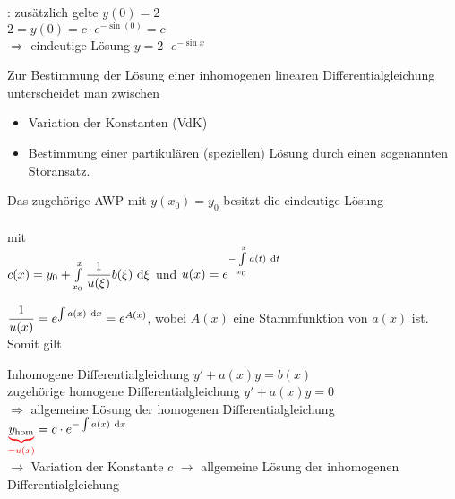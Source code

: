 : zusätzlich gelte $y(0)=2$\\
$2=y(0)=c\cdot e^{-\sin(0)}=c$\\
$\Rightarrow$ eindeutige Lösung $y=2\cdot e^{-\sin x}$

Zur Bestimmung der Lösung einer inhomogenen linearen Differentialgleichung unterscheidet man zwischen
\begin{itemize}
	\item Variation der Konstanten (VdK)
	\item Bestimmung einer partikulären (speziellen) Lösung durch einen sogenannten {\flqq Störansatz\frqq}.
\end{itemize}


Das zugehörige AWP mit $y(x_0)=y_0$ besitzt die eindeutige Lösung\\
\hhspace{2cm}\\
mit\\
\hhspace{2cm}$c(x)=y_0+\int\limits_{x_0}^{x}\dfrac{1}{u(\xi)}b(\xi)\ \mathrm{d}\xi$ und $u(x)=e^{-\int\limits_{x_0}^{x}a(t)\ \mathrm{d}t}$

\Bem $\dfrac{1}{u(x)}=e^{\int a(x)\ \mathrm{d}x}=e^{A(x)}$, wobei $A(x)$ eine Stammfunktion von $a(x)$ ist. Somit gilt\\

\Beweis Inhomogene Differentialgleichung $y'+a(x)y=b(x)$\\
zugehörige homogene Differentialgleichung $y'+a(x)y=0$\\
$\Rightarrow$ allgemeine Lösung der homogenen Differentialgleichung $\redunderbrace{y_{\text{hom}}}{=u(x)}=c\cdot e^{-\int a(x)\intd{x}}$\\
$\rightarrow$ Variation der Konstante $c$ $\rightarrow$ allgemeine Lösung der inhomogenen Differentialgleichung

